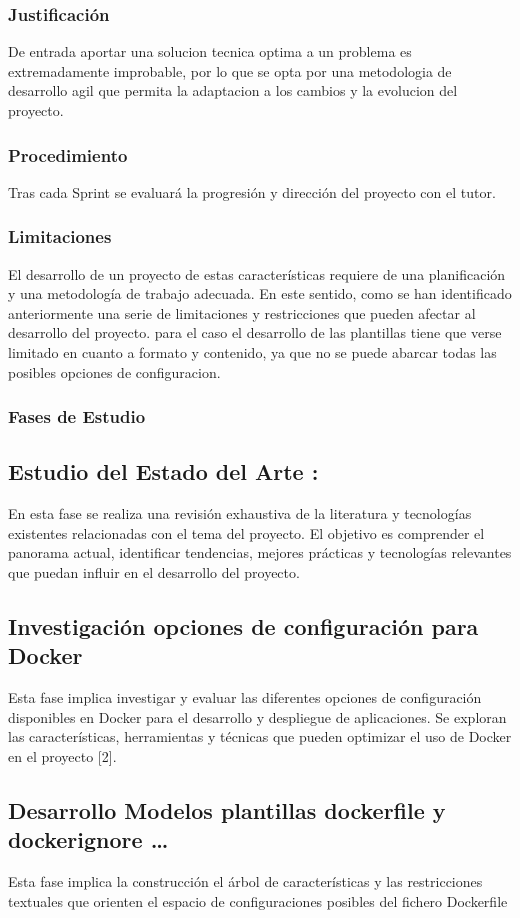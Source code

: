 \documentclass[12pt, a4paper, twoside]{article}
\begin{document}
\subsubsection{Justificación}
De entrada aportar una solucion tecnica optima a un problema es extremadamente improbable, por lo que se opta por una metodologia de desarrollo agil que permita la adaptacion a los cambios y la evolucion del proyecto.
\subsubsection{Procedimiento}
Tras cada Sprint se evaluará la progresión y dirección del proyecto con el tutor. 
\subsubsection{Limitaciones}
El desarrollo de un proyecto de estas características requiere de una planificación y una metodología de trabajo adecuada.
En este sentido, como se han identificado anteriormente una serie de limitaciones y restricciones que pueden afectar al desarrollo del proyecto.
para el caso el desarrollo de las plantillas tiene que verse limitado en cuanto a formato y contenido, ya que no se puede abarcar todas las posibles opciones de configuracion.
\subsubsection{Fases de Estudio}
\subsection{Estudio del Estado del Arte :}
En esta fase se realiza una revisión exhaustiva de la literatura y tecnologías existentes relacionadas con el tema del 
proyecto. El objetivo es comprender el panorama actual, identificar tendencias, mejores prácticas y tecnologías 
relevantes que puedan influir en el desarrollo del proyecto.
\subsection{Investigación opciones de configuración para Docker}
Esta fase implica investigar y evaluar las diferentes opciones de configuración disponibles en Docker para el desarrollo 
y despliegue de aplicaciones. Se exploran las características, herramientas y técnicas que pueden optimizar el uso de 
Docker en el proyecto [2].

\subsection{Desarrollo Modelos plantillas dockerfile y dockerignore …}
Esta fase implica la construcción el árbol de características y las restricciones textuales que orienten el espacio de 
configuraciones posibles del fichero Dockerfile 
\end{document}
